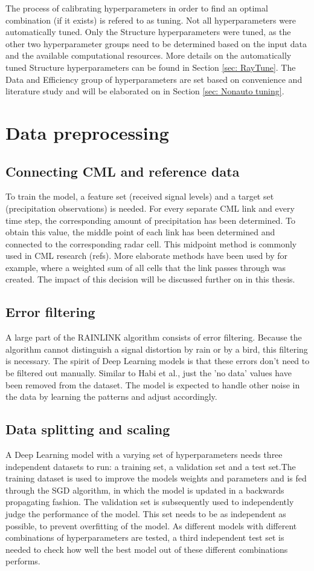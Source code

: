 \documentclass[twocolumn, 10pt, a4paper]{memoir}
\begin{document}
	The process of calibrating hyperparameters in order to find an optimal combination (if it exists) is refered to as tuning. Not all hyperparameters were automatically tuned. Only the Structure hyperparameters were tuned, as the other two hyperparameter groups need to be determined based on the input data and the available computational resources. More details on the automatically tuned Structure hyperparameters can be found in Section \ref{sec: RayTune}. The Data and Efficiency group of hyperparameters are set based on convenience and literature study and will be elaborated on in Section \ref{sec: Nonauto tuning}.
	
	
	\section{Data preprocessing} \label{sec: datapreprocess}
	\subsection{Connecting CML and reference data}
	To train the model, a feature set (received signal levels) and a target set (precipitation observations) is needed. For every separate CML link and every time step, the corresponding amount of precipitation has been determined. To obtain this value, the middle point of each link has been determined and connected to the corresponding radar cell. This midpoint method is commonly used in CML research (refs). More elaborate methods have been used by  for example, where a weighted sum of all cells that the link passes through was created. The impact of this decision will be discussed further on in this thesis.
	\subsection{Error filtering}
	A large part of the RAINLINK algorithm consists of error filtering. Because the algorithm cannot distinguish a signal distortion by rain or by a bird, this filtering is necessary. The spirit of Deep Learning models is that these errors don't need to be filtered out manually. Similar to Habi et al., just the 'no data' values have been removed from the dataset. The model is expected to handle other noise in the data by learning the patterns and adjust accordingly.
	\subsection{Data splitting and scaling}
	A Deep Learning model with a varying set of hyperparameters needs three independent datasets to run: a training set, a validation set and a test set.The training dataset is used to improve the models weights and parameters and is fed through the SGD algorithm, in which the model is updated in a backwards propagating fashion. The validation set is subsequently used to independently judge the performance of the model. This set needs to be as independent as possible, to prevent overfitting of the model.
	As different models with different combinations of hyperparameters are tested, a third independent test set is needed to check how well the best model out of these different combinations performs.  
	
\end{document}
